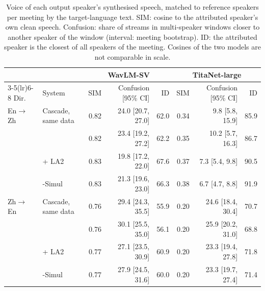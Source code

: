 \begin{table}[t]
\centering\small
\setlength{\tabcolsep}{4pt}
\begin{tabular}{llrrrrrr}
\toprule
 & & \multicolumn{3}{c}{WavLM-SV} & \multicolumn{3}{c}{TitaNet-large} \\
\cmidrule(lr){3-5}\cmidrule(lr){6-8}
Dir. & System & SIM & Confusion [95\% CI] & ID & SIM & Confusion [95\% CI] & ID \\
\midrule
En$\rightarrow$Zh & Cascade, same data & 0.82 & 24.0 [20.7, 27.0] & 62.0 & 0.34 & 9.8 [5.8, 15.9] & 85.9 \\
 & \sys{} & 0.82 & 23.4 [19.2, 27.2] & 62.2 & 0.35 & 10.2 [5.7, 16.3] & 86.7 \\
 & \sys{} + LA2 & 0.83 & 19.8 [17.2, 22.0] & 67.6 & 0.37 & 7.3 [5.4, 9.8] & 90.5 \\
 & \sys{}-Simul & 0.83 & 21.3 [19.6, 23.0] & 66.3 & 0.38 & 6.7 [4.7, 8.8] & 91.9 \\
\midrule
Zh$\rightarrow$En & Cascade, same data & 0.76 & 29.4 [24.3, 35.5] & 55.9 & 0.20 & 24.6 [18.4, 30.4] & 70.7 \\
 & \sys{} & 0.76 & 30.1 [25.5, 35.0] & 56.1 & 0.20 & 25.9 [20.2, 31.0] & 68.8 \\
 & \sys{} + LA2 & 0.77 & 27.1 [23.5, 30.9] & 60.9 & 0.20 & 23.3 [19.4, 27.8] & 71.8 \\
 & \sys{}-Simul & 0.77 & 27.9 [24.5, 31.6] & 60.0 & 0.20 & 23.3 [19.7, 27.4] & 71.4 \\
\bottomrule
\end{tabular}
\caption{Voice of each output speaker's synthesised speech, matched to reference speakers per meeting by the target-language text. SIM: cosine to the attributed speaker's own clean speech. Confusion: share of streams in multi-speaker windows closer to another speaker of the window (interval: meeting bootstrap). ID: the attributed speaker is the closest of all speakers of the meeting. Cosines of the two models are not comparable in scale.}
\label{tab:voice}
\end{table}
